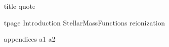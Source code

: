 
\usepackage{amssymb}
\usepackage{amsmath}
\usepackage{mathrsfs}
\usepackage{graphicx}
\usepackage{pdflscape}
\usepackage{color}




{title}                    %
{quote}                    %
\dsp                                            %
\ssp                                            %
\tableofcontents                                %
\newpage                                        %
\listoffigures                                  %
\newpage                                        %
\listoftables                                   %
\newpage

\dsp                                            %
{tpage}                    %
\newpage
{Introduction}               %
{StellarMassFunctions}               %
{reionization}               %


\appendix
{appendices}               %
\newpage
{a1}                  %
{a2}                  %

\newpage
\ssp                                            %

\ssp




